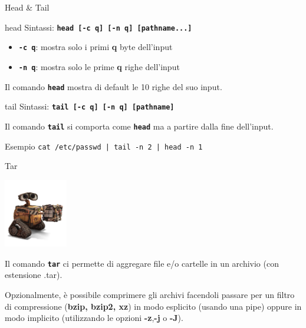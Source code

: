 \documentclass{beamer}
\begin{document}
    \begin{frame}{Head \& Tail}
        \begin{block}{head}
            \small
            Sintassi: \texttt{\textbf{head [-c q] [-n q] [pathname...]}}

            \begin{itemize}
                \item \texttt{\textbf{-c q}}: mostra solo i primi \textbf{q} byte dell'input
                \item \texttt{\textbf{-n q}}: mostra solo le prime \textbf{q} righe dell'input
            \end{itemize}

            Il comando \texttt{\textbf{head}} mostra di default le 10 righe del suo input.
        \end{block}

        \begin{block}{tail}
            \small
            Sintassi: \texttt{\textbf{tail [-c q] [-n q] [pathname]}}

            Il comando \texttt{\textbf{tail}} si comporta come \texttt{\textbf{head}} ma
            a partire dalla fine dell'input.
        \end{block}

        \begin{exampleblock}{Esempio}
            \small
            \texttt{cat /etc/passwd | tail -n 2 | head -n 1}
        \end{exampleblock}
    \end{frame}

    \begin{frame}{Tar}
        \begin{center}
            \includegraphics[height=3cm, keepaspectratio]{images/walle.png}
        \end{center}
        Il comando \texttt{\textbf{tar}} ci permette di aggregare file e/o cartelle in un archivio (con estensione .tar).
        
        \vspace{0.5cm}

        Opzionalmente, è possibile comprimere gli archivi facendoli
        passare per un filtro di compressione (\textbf{bzip, bzip2, xz}) in
        modo esplicito (usando una pipe) oppure in modo implicito (utilizzando le opzioni \textbf{-z},\textbf{-j} o \textbf{-J}).
    \end{frame}
\end{document}
